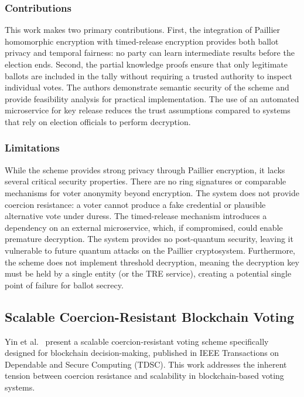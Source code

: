 \subsubsection{Contributions}
\label{subsubsec:tr-contrib}

This work makes two primary contributions. First, the integration of Paillier homomorphic encryption with timed-release encryption provides both ballot privacy and temporal fairness: no party can learn intermediate results before the election ends. Second, the partial knowledge proofs ensure that only legitimate ballots are included in the tally without requiring a trusted authority to inspect individual votes. The authors demonstrate semantic security of the scheme and provide feasibility analysis for practical implementation. The use of an automated microservice for key release reduces the trust assumptions compared to systems that rely on election officials to perform decryption.

\subsubsection{Limitations}
\label{subsubsec:tr-limits}

While the scheme provides strong privacy through Paillier encryption, it lacks several critical security properties. There are no ring signatures or comparable mechanisms for voter anonymity beyond encryption. The system does not provide coercion resistance: a voter cannot produce a fake credential or plausible alternative vote under duress. The timed-release mechanism introduces a dependency on an external microservice, which, if compromised, could enable premature decryption. The system provides no post-quantum security, leaving it vulnerable to future quantum attacks on the Paillier cryptosystem. Furthermore, the scheme does not implement threshold decryption, meaning the decryption key must be held by a single entity (or the TRE service), creating a potential single point of failure for ballot secrecy.

\subsection{Scalable Coercion-Resistant Blockchain Voting}
\label{subsec:yin-tdsc}

Yin et al.~\cite{yin_tdsc} present a scalable coercion-resistant voting scheme specifically designed for blockchain decision-making, published in IEEE Transactions on Dependable and Secure Computing (TDSC). This work addresses the inherent tension between coercion resistance and scalability in blockchain-based voting systems.

